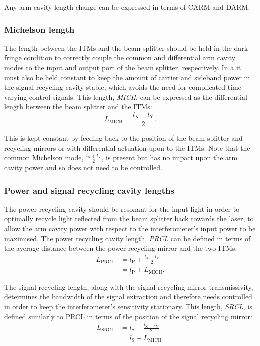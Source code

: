 Any arm cavity length change can be expressed in terms of \gls{CARM} and \gls{DARM}.

\subsubsection{Michelson length}
The length between the \glspl{ITM} and the beam splitter should be held in the dark fringe condition to correctly couple the common and differential arm cavity modes to the input and output port of the beam splitter, respectively. In a \DRFPMI{} it must also be held constant to keep the amount of carrier and sideband power in the signal recycling cavity stable, which avoids the need for complicated time-varying control signals. This length, \emph{\gls{MICH}}, can be expressed as the differential length between the beam splitter and the \glspl{ITM}:
\begin{equation}
  L_{\text{MICH}} = \frac{l_{\text{X}} - l_{\text{Y}}}{2}.
\end{equation}

This is kept constant by feeding back to the position of the beam splitter and recycling mirrors or with differential actuation upon to the \glspl{ITM}. Note that the common Michelson mode, $\frac{l_{\text{X}} + l_{\text{Y}}}{2}$, is present but has no impact upon the arm cavity power and so does not need to be controlled.

\subsubsection{Power and signal recycling cavity lengths}
The power recycling cavity should be resonant for the input light in order to optimally recycle light reflected from the beam splitter back towards the laser, to allow the arm cavity power with respect to the interferometer's input power to be maximised. The power recycling cavity length, \emph{\gls{PRCL}} can be defined in terms of the average distance between the power recycling mirror and the two \glspl{ITM}:
\begin{equation}
  \label{eq:prcl-length}
  \begin{split}
    L_{\text{PRCL}} &= l_{\text{P}} + \frac{l_{\text{X}} - l_{\text{Y}}}{2} \\
		    &= l_{\text{P}} + L_{\text{MICH}}.
  \end{split}
\end{equation}

The signal recycling length, along with the signal recycling mirror transmissivity, determines the bandwidth of the signal extraction and therefore needs controlled in order to keep the interferometer's sensitivity stationary. This length, \emph{\gls{SRCL}}, is defined similarly to \gls{PRCL} in terms of the position of the signal recycling mirror:
\begin{equation}
  \label{eq:srcl-length}
  \begin{split}
    L_{\text{SRCL}} &= l_{\text{S}} + \frac{l_{\text{X}} - l_{\text{Y}}}{2} \\
		    &= l_{\text{S}} + L_{\text{MICH}}.
  \end{split}
\end{equation}


